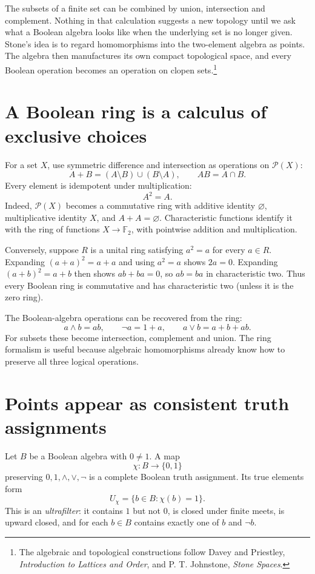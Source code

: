 
The subsets of a finite set can be combined by union, intersection and complement. Nothing in that calculation suggests a new topology until we ask what a Boolean algebra looks like when the underlying set is no longer given. Stone's idea is to regard homomorphisms into the two-element algebra as points. The algebra then manufactures its own compact topological space, and every Boolean operation becomes an operation on clopen sets.\footnote{The algebraic and topological constructions follow Davey and Priestley, \emph{Introduction to Lattices and Order}, and P. T. Johnstone, \emph{Stone Spaces}.}

\section{A Boolean ring is a calculus of exclusive choices}

For a set \(X\), use symmetric difference and intersection as operations on \(\mathcal P(X)\):
\[
 A+B=(A\setminus B)\cup(B\setminus A),
 \qquad AB=A\cap B.
\]
Every element is idempotent under multiplication:
\[
 A^2=A.
\]
Indeed, \(\mathcal P(X)\) becomes a commutative ring with additive identity \(\varnothing\), multiplicative identity \(X\), and \(A+A=\varnothing\). Characteristic functions identify it with the ring of functions \(X\to\mathbb F_2\), with pointwise addition and multiplication.

Conversely, suppose \(R\) is a unital ring satisfying \(a^2=a\) for every \(a\in R\). Expanding \((a+a)^2=a+a\) and using \(a^2=a\) shows \(2a=0\). Expanding \((a+b)^2=a+b\) then shows \(ab+ba=0\), so \(ab=ba\) in characteristic two. Thus every Boolean ring is commutative and has characteristic two (unless it is the zero ring).

The Boolean-algebra operations can be recovered from the ring:
\[
 a\wedge b=ab,\qquad
 \neg a=1+a,\qquad
 a\vee b=a+b+ab.
\]
For subsets these become intersection, complement and union. The ring formalism is useful because algebraic homomorphisms already know how to preserve all three logical operations.

\section{Points appear as consistent truth assignments}

Let \(B\) be a Boolean algebra with \(0\ne1\). A map
\[
 \chi:B\longrightarrow\{0,1\}
\]
preserving \(0,1,\wedge,\vee,\neg\) is a complete Boolean truth assignment. Its true elements form
\[
 U_\chi=\{b\in B:\chi(b)=1\}.
\]
This is an \emph{ultrafilter}: it contains \(1\) but not \(0\), is closed under finite meets, is upward closed, and for each \(b\in B\) contains exactly one of \(b\) and \(\neg b\).

